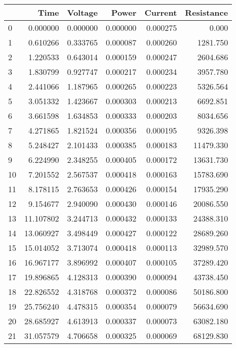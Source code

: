 \begin{tabular}{lrrrrr}
\toprule
{} &         Time &   Voltage &     Power &   Current &   Resistance \\
\midrule
0  &     0.000000 &  0.000000 &  0.000000 &  0.000275 &        0.000 \\
1  &     0.610266 &  0.333765 &  0.000087 &  0.000260 &     1281.750 \\
2  &     1.220533 &  0.643014 &  0.000159 &  0.000247 &     2604.686 \\
3  &     1.830799 &  0.927747 &  0.000217 &  0.000234 &     3957.780 \\
4  &     2.441066 &  1.187965 &  0.000265 &  0.000223 &     5326.564 \\
5  &     3.051332 &  1.423667 &  0.000303 &  0.000213 &     6692.851 \\
6  &     3.661598 &  1.634853 &  0.000333 &  0.000203 &     8034.656 \\
7  &     4.271865 &  1.821524 &  0.000356 &  0.000195 &     9326.398 \\
8  &     5.248427 &  2.101433 &  0.000385 &  0.000183 &    11479.330 \\
9  &     6.224990 &  2.348255 &  0.000405 &  0.000172 &    13631.730 \\
10 &     7.201552 &  2.567537 &  0.000418 &  0.000163 &    15783.690 \\
11 &     8.178115 &  2.763653 &  0.000426 &  0.000154 &    17935.290 \\
12 &     9.154677 &  2.940090 &  0.000430 &  0.000146 &    20086.550 \\
13 &    11.107802 &  3.244713 &  0.000432 &  0.000133 &    24388.310 \\
14 &    13.060927 &  3.498449 &  0.000427 &  0.000122 &    28689.260 \\
15 &    15.014052 &  3.713074 &  0.000418 &  0.000113 &    32989.570 \\
16 &    16.967177 &  3.896992 &  0.000407 &  0.000105 &    37289.420 \\
17 &    19.896865 &  4.128313 &  0.000390 &  0.000094 &    43738.450 \\
18 &    22.826552 &  4.318768 &  0.000372 &  0.000086 &    50186.800 \\
19 &    25.756240 &  4.478315 &  0.000354 &  0.000079 &    56634.690 \\
20 &    28.685927 &  4.613913 &  0.000337 &  0.000073 &    63082.180 \\
21 &    31.057579 &  4.706658 &  0.000325 &  0.000069 &    68129.830 \\

\end{tabular}
